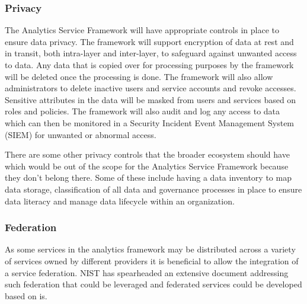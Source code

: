 \subsubsection{Privacy}\label{sec:privacy}

The Analytics Service Framework will have appropriate controls in
place to ensure data privacy. The framework will support encryption
of data at rest and in transit, both intra-layer and inter-layer, to
safeguard against unwanted access to data. Any data that is copied
over for processing purposes by the framework will be deleted once the
processing is done. The framework will also allow administrators to
delete inactive users and service accounts and revoke
accesses. Sensitive attributes in the data will be masked from users
and services based on roles and policies. The framework will also
audit and log any access to data which can then be monitored in a
Security Incident Event Management System (SIEM) for unwanted or
abnormal access.

There are some other privacy controls that the broader ecosystem
should have which would be out of the scope for the Analytics Service
Framework because they don't belong there. Some of these include
having a data inventory to map data storage, classification of all
data and governance processes in place to ensure data literacy and
manage data lifecycle within an organization.

\subsubsection{Federation}

As some services in the analytics framework may be distributed across
a variety of services owned by different providers it is beneficial to
allow the integration of a service federation. NIST has spearheaded an
extensive document \cite{nist-Lee2020} addressing such federation that
could be leveraged and federated services could be developed based on
is.

\begin{comment}
\subsubsection{Artifacts}

function
data
logs and  audit

\subsubsection{Privacy}

privacy
    input
    output
    function
    
asynchronous events, how does privacy apply
batch functions
streaming functions

data
\end{comment}

